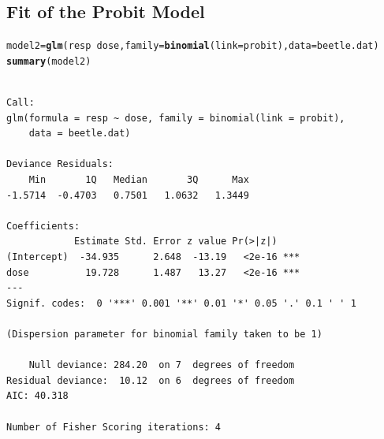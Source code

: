 \documentclass{article}\usepackage[]{graphicx}\usepackage[svgnames]{xcolor}
\makeatletter
\newcommand{\hlopt}[1]{\textcolor[rgb]{0,0,0}{#1}}%
\newcommand{\hlstd}[1]{\textcolor[rgb]{0.345,0.345,0.345}{#1}}%
\newcommand{\hlkwb}[1]{\textcolor[rgb]{0.69,0.353,0.396}{#1}}%
\newcommand{\hlkwc}[1]{\textcolor[rgb]{0.333,0.667,0.333}{#1}}%
\newcommand{\hlkwd}[1]{\textcolor[rgb]{0.737,0.353,0.396}{\textbf{#1}}}%
\newenvironment{kframe}{%
 \def\at@end@of@kframe{}%
 \ifinner\ifhmode%
  \def\at@end@of@kframe{\end{minipage}}%
  \begin{minipage}{\columnwidth}%
 \fi\fi%
 \def\FrameCommand##1{\hskip\@totalleftmargin \hskip-\fboxsep
 \colorbox{shadecolor}{##1}\hskip-\fboxsep
     \hskip-\linewidth \hskip-\@totalleftmargin \hskip\columnwidth}%
 \MakeFramed {\advance\hsize-\width
   \@totalleftmargin\z@ \linewidth\hsize
   \@setminipage}}%
 {\par\unskip\endMakeFramed%
 \at@end@of@kframe}
\newenvironment{knitrout}{}{} %
\makeatother
\begin{document}
\subsection*{Fit of the Probit Model}
\begin{knitrout}
\color{fgcolor}\begin{kframe}
\begin{alltt}
\hlstd{model2} \hlkwb{=} \hlkwd{glm}\hlstd{(resp} \hlopt{~} \hlstd{dose,} \hlkwc{family} \hlstd{=} \hlkwd{binomial}\hlstd{(}\hlkwc{link} \hlstd{= probit),} \hlkwc{data} \hlstd{= beetle.dat)}
\hlkwd{summary}\hlstd{(model2)}
\end{alltt}
\begin{verbatim}

Call:
glm(formula = resp ~ dose, family = binomial(link = probit), 
    data = beetle.dat)

Deviance Residuals: 
    Min       1Q   Median       3Q      Max  
-1.5714  -0.4703   0.7501   1.0632   1.3449  

Coefficients:
            Estimate Std. Error z value Pr(>|z|)    
(Intercept)  -34.935      2.648  -13.19   <2e-16 ***
dose          19.728      1.487   13.27   <2e-16 ***
---
Signif. codes:  0 '***' 0.001 '**' 0.01 '*' 0.05 '.' 0.1 ' ' 1

(Dispersion parameter for binomial family taken to be 1)

    Null deviance: 284.20  on 7  degrees of freedom
Residual deviance:  10.12  on 6  degrees of freedom
AIC: 40.318

Number of Fisher Scoring iterations: 4
\end{verbatim}
\end{kframe}
\end{knitrout}
\end{document}
